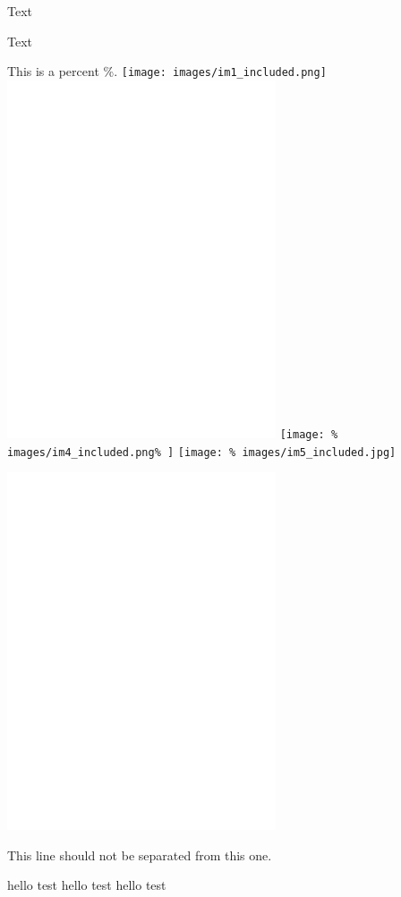 
Text

Text%


This is a percent \%.
\texttt{[image: images/im1\_included.png]}
\includegraphics{images/im3_included.png}
\texttt{[image: \%
  images/im4\_included.png\%
  ]}
\texttt{[image: \%
  images/im5\_included.jpg]}

\includegraphics{./images/im3_included.png}

This line should not be separated
%
from this one.

\newif\ifvar

\ifvar
\fi

\newcommand{\red}[1]{{\color{red} #1}}
hello test hello
test hello
test



